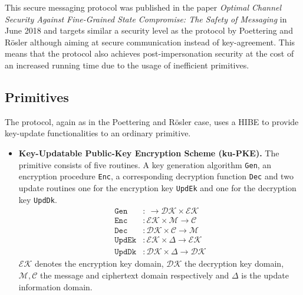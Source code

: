 \documentclass[11pt,a4paper,twoside,openright,bibliography=totoc]{scrbook}
\begin{document}
This secure messaging protocol was published in the paper
\textit{Optimal Channel Security Against Fine-Grained State Compromise: The Safety of Messaging}
in June 2018 and targets similar a security level as the protocol by
Poettering and Rösler although aiming at secure communication instead
of key-agreement. This means that the protocol also achieves
post-impersonation security at the cost of an increased running time due
to the usage of inefficient primitives. 

\subsection{Primitives}
\label{sec:primitives-1}

The protocol, again as in the Poettering and Rösler case, uses a HIBE to provide
key-update functionalities to an ordinary primitive.
\begin{itemize}
\item \textbf{Key-Updatable Public-Key Encryption Scheme (ku-PKE).} The primitive
  consists of five routines. A key generation algorithm \texttt{Gen},
  an encryption procedure \texttt{Enc}, a corresponding decryption
  function \texttt{Dec} and two update routines one for the
  encryption key \texttt{UpdEk} and one for the decryption key \texttt{UpdDk}.
  \begin{align*}
    \texttt{Gen} & : \ \rightarrow \mathcal{DK} \times \mathcal{EK} \\
    \texttt{Enc} & : \mathcal{EK} \times \mathcal{M} \rightarrow \mathcal{C} \\
    \texttt{Dec} & : \mathcal{DK} \times \mathcal{C} \rightarrow \mathcal{M} \\
    \texttt{UpdEk} & : \mathcal{EK} \times \Delta \rightarrow \mathcal{EK} \\
    \texttt{UpdDk} & : \mathcal{DK} \times \Delta \rightarrow \mathcal{DK}
  \end{align*}
  $\mathcal{EK}$ denotes the encryption key domain, $\mathcal{DK}$ the
  decryption key domain, $\mathcal{M}, \mathcal{C}$ the message and
  ciphertext domain respectively and $\Delta$ is the update information domain.
\end{itemize}
\end{document}
